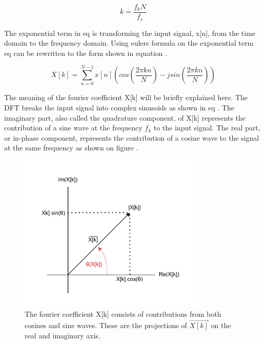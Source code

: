\begin{equation}\label{eq:4_7_2_SA4}
    k = \frac{f_k N}{f_s} 
\end{equation}

The exponential term in eq  is transforming the input signal, x[n], from the time domain to the frequency domain. Using eulers formula on the exponential term eq  can be rewritten to the form shown in equation .

\begin{equation}\label{eq:4_7_2_SA2}
    X[k] = \sum_{n=0}^{N-1} x[n] \left(cos\left(\frac{2\pi kn}{N}\right) -jsin\left(\frac{2\pi kn}{N}\right)\right)
\end{equation}

The meaning of the fourier coefficient X[k] will be briefly explained here. The DFT breaks the input signal into complex sinusoids as shown in eq . The imaginary part, also called the quadrature component, of X[k] represents the contribution of a sine wave at the frequency $f_k$ to the input signal. The real part, or in-phase component, represents the contribution of a cosine wave to the signal at the same frequency as shown on figure .
\begin{figure}[H]
    \centering
    \includegraphics[clip, trim=0 0 0 0, width=0.8\textwidth]{Sections/7_SystemDesign/Figures/7_3_2_DFTUnderstand1.pdf}
    \caption{The fourier coefficient X[k] consists of contributions from both cosines and sine waves. These are the projections of $\vec{X[k]}$ on the real and imaginary axis.}
    \label{fig:7_3_2_DFTU1}
\end{figure}

